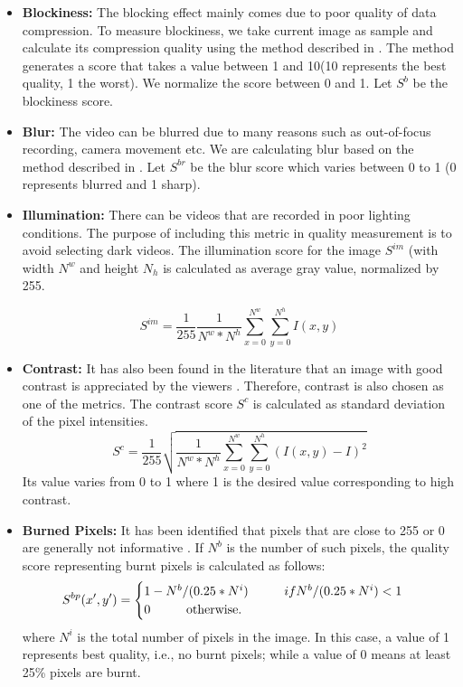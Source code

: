 \documentclass{sig-alternate}
\newcommand\tab[1][1cm]{\hspace*{#1}}
\begin{document}
\begin{itemize}
\item \textbf{Blockiness:} The blocking effect mainly comes due to poor quality of data compression. To measure blockiness, we take current image as sample and calculate its compression quality using the method described in \cite{carter2007ceramic}. The method generates  a score that takes a value between 1 and 10(10 represents the best quality, 1 the worst). We normalize the score between 0 and 1. Let \(S^b\) be the blockiness score. 
\item \textbf{Blur:} The video can be blurred due to many reasons such as out-of-focus recording, camera movement etc. We are calculating blur based on the method described in \cite{cabrera2001path}. Let \(S^{br}\) be the blur score which varies between 0 to 1 (0 represents blurred and 1 sharp). 
\item \textbf{Illumination:} There can be videos that are recorded in poor lighting conditions. The purpose of including this metric in quality measurement is to avoid selecting dark videos. The illumination score for the image \(S^{im}\) (with width \(N^w\) and height \(N_h\) is calculated as average gray value, normalized by 255.

\begin{equation}
 S^{im} = \frac{1}{255}\frac{1}{N^w * N^h}\sum_{x=0}^{N^w}\sum_{y=0}^{N^h}I(x,y) 
\end{equation}
\item \textbf{Contrast:} It has also been found in the literature that an image with good contrast is appreciated by the viewers \cite{saini2012movimash}. Therefore, contrast is also chosen as one of the metrics. The contrast score \(S^c\) is calculated as standard deviation of the pixel intensities.
\begin{equation}
S^c = \frac{1}{255} \sqrt{\frac{1}{N^w * N^h}\sum_{x=0}^{N^w}\sum_{y=0}^{N^h}(I(x,y) - I)^2}
\end{equation}
Its value varies from 0 to 1 where 1 is the desired value corresponding to high contrast.

\item \textbf{Burned Pixels:} It has been identiﬁed that pixels that are close to 255 or 0 are generally not informative \cite{wyszecki1982color}. If \(N^b\) is the number of such pixels, the quality score representing burnt pixels is calculated as follows: 
\begin{equation}
S^{bp}(x',y')=
\begin{cases}
1 - N^b/(0.25*N^i)\tab if N^b/(0.25*N^i) < 1 \\
0 \tab  \text{otherwise}. 
\end{cases}
\end{equation}
where \(N^i\) is the total number of pixels in the image. In this case, a value of 1 represents best quality, i.e., no burnt pixels; while a value of 0 means at least 25\% pixels are burnt.
\end{itemize} 
\end{document}
